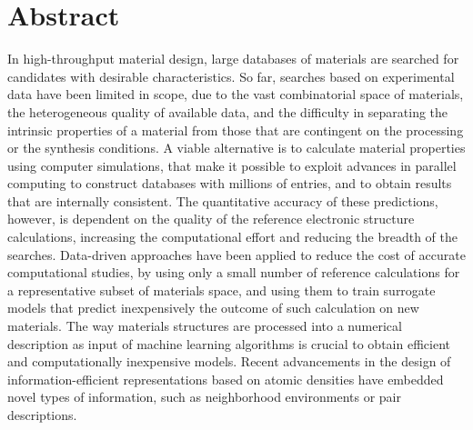
\chapter*{Abstract}
In high-throughput material design, large databases of materials are searched
for candidates with desirable characteristics. So far, searches based on
experimental data have been limited in scope, due to the vast combinatorial
space of materials, the heterogeneous quality of available data, and the
difficulty in separating the intrinsic properties of a material from those that
are contingent on the processing or the synthesis conditions. A viable
alternative is to calculate material properties using computer simulations,
that make it possible to exploit advances in parallel computing to construct
databases with millions of entries, and to obtain results that are internally
consistent. The quantitative accuracy of these predictions, however, is
dependent on the quality of the reference electronic structure calculations,
increasing the computational effort and reducing the breadth of the searches.
Data-driven approaches have been applied to reduce the cost of accurate
computational studies, by using only a small number of reference calculations
for a representative subset of materials space, and using them to train
surrogate models that predict inexpensively the outcome of such calculation on
new materials. The way materials structures are processed into a numerical
description as input of machine learning algorithms is crucial to obtain
efficient and computationally inexpensive models.  Recent advancements in the
design of information-efficient representations based on atomic densities have embedded novel types of
information, such as neighborhood environments or pair descriptions.

